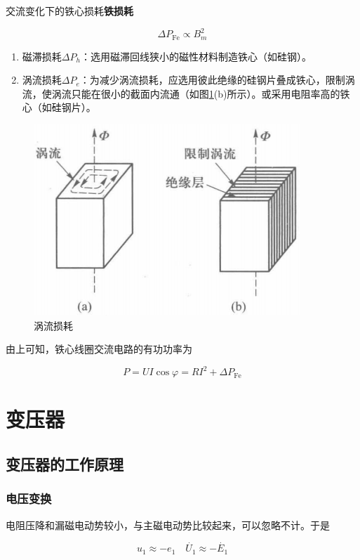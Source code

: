 \documentclass[12pt]{article}
\begin{document}
交流变化下的铁心损耗\textbf{铁损耗}

\begin{equation}
\Delta P_{\text{Fe}} \propto B_m^2
\end{equation}

\begin{enumerate}
\item 磁滞损耗$\Delta P_h$：选用磁滞回线狭小的磁性材料制造铁心（如硅钢）。
\item 涡流损耗$\Delta P_e$：为减少涡流损耗，应选用彼此绝缘的硅钢片叠成铁心，限制涡流，使涡流只能在很小的截面内流通（如图\ref{涡流损耗}(b)所示）。或采用电阻率高的铁心（如硅钢片）。
\end{enumerate}

\begin{figure}[!h]
\centering
\includegraphics[width = .3\textwidth]{graphics/Screenshot 2025-09-11 at 21.07.39.png}
\caption{涡流损耗}
\label{涡流损耗}
\end{figure}

由上可知，铁心线圈交流电路的有功功率为

\begin{equation}
P = UI \cos \varphi = RI^2 + \Delta P_{\text{Fe}}
\end{equation}

\section{变压器}

\subsection{变压器的工作原理}

\subsubsection{电压变换}

电阻压降和漏磁电动势较小，与主磁电动势比较起来，可以忽略不计。于是

\begin{equation}
    u_1 \approx - e_1 \quad \dot{U_1} \approx - \dot{E_1}
\end{equation}
\end{document}
